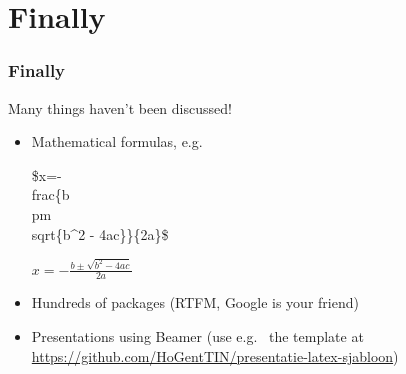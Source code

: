 \documentclass[aspectratio=169]{beamer}
\begin{document}
\section{Finally}

\begin{frame}[fragile]
 \frametitle{Finally}

  Many things haven't been discussed!

  \begin{itemize}
    \item<+-> Mathematical formulas, e.g.
    \begin{semiverbatim}
      \$x=-\\frac\{b \\pm \\sqrt\{b\^{}2 - 4ac\}\}\{2a\}\$
    \end{semiverbatim}
    \(x=-\frac{b \pm \sqrt{b^2 - 4ac}}{2a}\)
    \item<+-> Hundreds of packages (RTFM, Google is your friend)
    \item<+-> Presentations using Beamer (use e.g. \ the template at \url{https://github.com/HoGentTIN/presentatie-latex-sjabloon})

  \end{itemize}
\end{frame}
\end{document}
